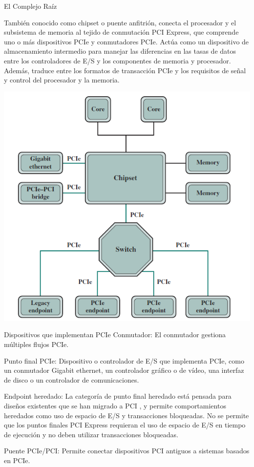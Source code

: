\documentclass[presentation]{beamer}
\begin{document}
\begin{frame}[label={sec:orgab6b1b3}]{El Complejo Raíz}
\begin{minipage}{0.5\textwidth}
También conocido como chipset o puente anfitrión, conecta el procesador y el subsistema de memoria al tejido de conmutación PCI Express, que comprende uno o más dispositivos PCIe y conmutadores PCIe.
Actúa como un dispositivo de almacenamiento intermedio para manejar las diferencias en las tasas de datos entre los controladores de E/S y los componentes de memoria y procesador.
Además, traduce entre los formatos de transacción PCIe y los requisitos de señal y control del procesador y la memoria.
\end{minipage}%
\begin{minipage}{0.5\textwidth}
\includegraphics[width=\linewidth]{./Images/raiz.png}
\end{minipage}
\end{frame}

\begin{frame}[label={sec:org07014fc}]{Dispositivos que implementan PCIe}
\alert{\alert{Conmutador:}} El conmutador gestiona múltiples flujos PCIe.

\alert{\alert{Punto final PCIe:}} Dispositivo o controlador de E/S que implementa PCIe, como un
conmutador Gigabit ethernet, un controlador gráfico o de vídeo, una interfaz de
disco o un controlador de comunicaciones.

\alert{\alert{Endpoint heredado:}} La categoría de punto final heredado está pensada para diseños
existentes que se han migrado a PCI , y permite comportamientos heredados como uso de espacio de E/S y transacciones bloqueadas. No se permite que los
puntos finales PCI Express requieran el uso de espacio de E/S en tiempo de
ejecución y no deben utilizar transacciones bloqueadas.

\alert{\alert{Puente PCIe/PCI:}} Permite conectar dispositivos PCI antiguos a sistemas basados
en PCIe.
\end{frame}
\end{document}
